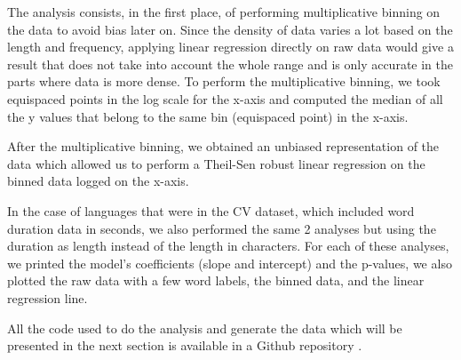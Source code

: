 The analysis consists, in the first place, of performing multiplicative binning on the data to avoid bias later on. Since the density of data varies a lot based on the length and frequency, applying linear regression directly on raw data would give a result that does not take into account the whole range and is only accurate in the parts where data is more dense. To perform the multiplicative binning, we took equispaced points in the log scale for the x-axis and computed the median of all the y values that belong to the same bin (equispaced point) in the x-axis.

After the multiplicative binning, we obtained an unbiased representation of the data which allowed us to perform a Theil-Sen robust linear regression on the binned data logged on the x-axis.

In the case of languages that were in the CV dataset, which included word duration data in seconds, we also performed the same 2 analyses but using the duration as length instead of the length in characters. For each of these analyses, we printed the model's coefficients (slope and intercept) and the p-values, we also plotted the raw data with a few word labels, the binned data, and the linear regression line.

All the code used to do the analysis and generate the data which will be presented in the next section is available in a Github repository \cite{IQL-code}.